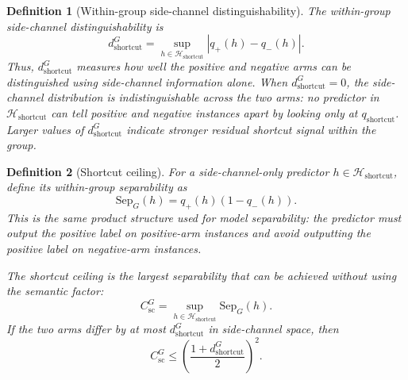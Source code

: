 \documentclass[conference]{IEEEtran}
\newtheorem{definition}{Definition}
\theoremstyle{remark}
\newcommand{\Sep}{\mathrm{Sep}}
\newcommand{\shortcutDisc}{d_{\mathrm{shortcut}}^{G}}
\newcommand{\shortcutHypCls}{\mathcal{H}_{\mathrm{shortcut}}}
\newcommand{\shortcutPosRate}[1]{q_{+}(#1)}
\newcommand{\shortcutNegRate}[1]{q_{-}(#1)}
\newcommand{\shortcutCeiling}{C_{\mathrm{sc}}^{G}}
\newcommand{\shortcutFac}{q_{\mathrm{shortcut}}}
\begin{document}
\begin{definition}[Within-group side-channel distinguishability]
The within-group side-channel distinguishability is
\begin{equation}\label{eq:formula-17}
\shortcutDisc
=
\sup_{h\in\shortcutHypCls}
\left|
\shortcutPosRate{h}-\shortcutNegRate{h}
\right|.
\end{equation}
Thus, $\shortcutDisc$ measures how well the positive and negative arms can be
distinguished using side-channel information alone.
When $\shortcutDisc=0$, the side-channel distribution is indistinguishable across
the two arms: no predictor in $\shortcutHypCls$ can tell positive and negative
instances apart by looking only at $\shortcutFac$.
Larger values of $\shortcutDisc$ indicate stronger residual shortcut signal
within the group.
\end{definition}





\begin{definition}[Shortcut ceiling]
\label{def:shortcutceiling}
For a side-channel-only predictor $h\in\shortcutHypCls$, define its within-group
separability as
\begin{equation}\label{eq:formula-18}
\Sep_G(h)=\shortcutPosRate{h}(1-\shortcutNegRate{h}).
\end{equation}
This is the same product structure used for model separability: the predictor
must output the positive label on positive-arm instances and avoid outputting
the positive label on negative-arm instances.

The shortcut ceiling is the largest separability that can be achieved
without using the semantic factor:
\begin{equation}\label{eq:formula-19}
\shortcutCeiling
=
\sup_{h\in\shortcutHypCls}\Sep_G(h).
\end{equation}
If the two arms differ by at most $\shortcutDisc$ in side-channel space, then
\begin{equation}\label{eq:formula-20}
\shortcutCeiling
\le
\left(\frac{1+\shortcutDisc}{2}\right)^2.
\end{equation}
\end{definition}
\end{document}
